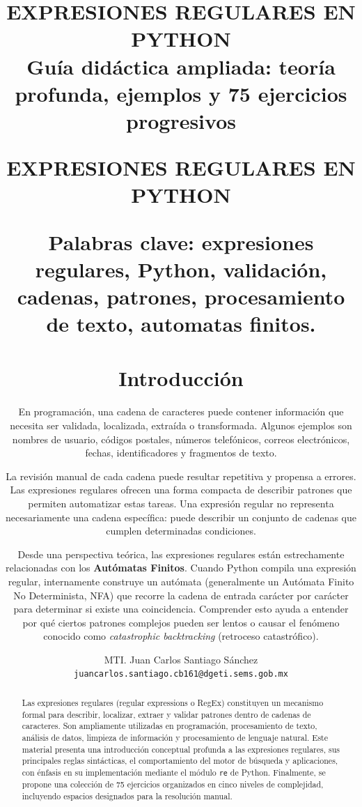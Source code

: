 \documentclass[12pt]{article}
\title{EXPRESIONES REGULARES EN PYTHON\\[0.3em]
\large Guía didáctica ampliada: teoría profunda, ejemplos y 75 ejercicios progresivos}
\author{MTI. Juan Carlos Santiago Sánchez\\[0.2em]
\texttt{juancarlos.santiago.cb161@dgeti.sems.gob.mx}}
\date{}
\begin{document}
\maketitle
\newpage
\begingroup
\setlength{\parskip}{0pt}
\tableofcontents
\endgroup
\newpage

\title{EXPRESIONES REGULARES EN PYTHON\\[0.3em]
\begin{abstract}
Las expresiones regulares (regular expressions o RegEx) constituyen un mecanismo formal para describir, localizar, extraer y validar patrones dentro de cadenas de caracteres. Son ampliamente utilizadas en programación, procesamiento de texto, análisis de datos, limpieza de información y procesamiento de lenguaje natural. Este material presenta una introducción conceptual profunda a las expresiones regulares, sus principales reglas sintácticas, el comportamiento del motor de búsqueda y aplicaciones, con énfasis en su implementación mediante el módulo \texttt{re} de Python. Finalmente, se propone una colección de 75 ejercicios organizados en cinco niveles de complejidad, incluyendo espacios designados para la resolución manual.
\end{abstract}

\noindent\textbf{Palabras clave:} expresiones regulares, Python, validación, cadenas, patrones, procesamiento de texto, automatas finitos.

\section{Introducción}
En programación, una cadena de caracteres puede contener información que necesita ser validada, localizada, extraída o transformada. Algunos ejemplos son nombres de usuario, códigos postales, números telefónicos, correos electrónicos, fechas, identificadores y fragmentos de texto.

La revisión manual de cada cadena puede resultar repetitiva y propensa a errores. Las expresiones regulares ofrecen una forma compacta de describir patrones que permiten automatizar estas tareas. Una expresión regular no representa necesariamente una cadena específica: puede describir un conjunto de cadenas que cumplen determinadas condiciones.

Desde una perspectiva teórica, las expresiones regulares están estrechamente relacionadas con los \textbf{Autómatas Finitos}. Cuando Python compila una expresión regular, internamente construye un autómata (generalmente un Autómata Finito No Determinista, NFA) que recorre la cadena de entrada carácter por carácter para determinar si existe una coincidencia. Comprender esto ayuda a entender por qué ciertos patrones complejos pueden ser lentos o causar el fenómeno conocido como \textit{catastrophic backtracking} (retroceso catastrófico).

}
\end{document}
